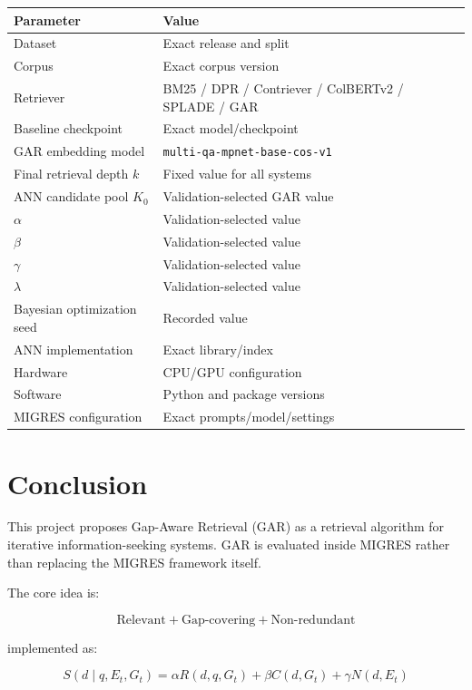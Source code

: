 \documentclass[11pt,a4paper]{article}
\begin{document}
\begin{center}
\begin{tabular}{ll}
\toprule
\textbf{Parameter} & \textbf{Value}\\
\midrule
Dataset & Exact release and split\\
Corpus & Exact corpus version\\
Retriever & BM25 / DPR / Contriever / ColBERTv2 / SPLADE / GAR\\
Baseline checkpoint & Exact model/checkpoint\\
GAR embedding model & \texttt{multi-qa-mpnet-base-cos-v1}\\
Final retrieval depth $k$ & Fixed value for all systems\\
ANN candidate pool $K_0$ & Validation-selected GAR value\\
$\alpha$ & Validation-selected value\\
$\beta$ & Validation-selected value\\
$\gamma$ & Validation-selected value\\
$\lambda$ & Validation-selected value\\
Bayesian optimization seed & Recorded value\\
ANN implementation & Exact library/index\\
Hardware & CPU/GPU configuration\\
Software & Python and package versions\\
MIGRES configuration & Exact prompts/model/settings\\
\bottomrule
\end{tabular}
\end{center}

\section{Conclusion}

This project proposes Gap-Aware Retrieval (GAR) as a retrieval algorithm for iterative information-seeking systems. GAR is evaluated inside MIGRES rather than replacing the MIGRES framework itself.

The core idea is:

\[
\boxed{
\text{Relevant}
+
\text{Gap-covering}
+
\text{Non-redundant}
}
\]

implemented as:

\[
\boxed{
S(d\mid q,E_t,G_t)
=
\alpha R(d,q,G_t)
+
\beta C(d,G_t)
+
\gamma N(d,E_t)
}
\]
\end{document}
